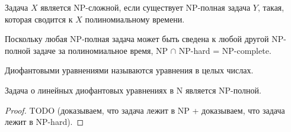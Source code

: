     \begin{Def}
         Задача $X$ является NP-сложной, если существует NP-полная задача $Y$, такая, которая сводится к $X$ полиномиальному времени.
    \end{Def}
    \begin{Rem}
        Поскольку любая NP-полная задача может быть сведена к любой другой NP-полной задаче за полиномиальное время, 
        NP $\cap$ NP-hard = NP-complete.
    \end{Rem}
    \begin{Def}
        Диофантовыми уравнениями называются уравнения в целых числах.
    \end{Def}
    \begin{Thm}
        Задача о линейных диофантовых уравнениях в N является NP-полной.
    \end{Thm}
    \begin{proof}
        TODO (доказываем, что задача лежит в NP + доказываем, что задача лежит в NP-hard).
    \end{proof}

    
    
